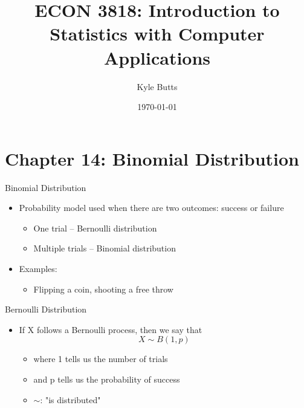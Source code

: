 \documentclass{beamer}
\title{ECON 3818: Introduction to Statistics with Computer Applications}
\date{\today}
\author{Kyle Butts}
\begin{document}
\maketitle





\section{Chapter 14: Binomial Distribution}
\begin{frame}{Binomial Distribution}
	
	\begin{itemize}
		\item Probability model used when there are two outcomes: success or failure
		      \begin{itemize}
		      	\item One trial -- \alert{Bernoulli distribution}
		      	\item Multiple trials -- \alert{Binomial distribution}
		      \end{itemize}
		\item Examples:
		      \begin{itemize}
		      	\item Flipping a coin, shooting a free throw
		      \end{itemize}
	\end{itemize}
	
\end{frame}

\begin{frame}{Bernoulli Distribution}
	
	\begin{itemize}
		\item If X follows a Bernoulli process, then we say that $$X \sim B(1,p)$$
		      \begin{itemize} 
		      	\item where 1 tells us the number of trials
		      	\item and p tells us the probability of success
		      	\item $\sim$: "is distributed"
		      \end{itemize}
	\end{itemize}
	
\end{frame}
\end{document}
